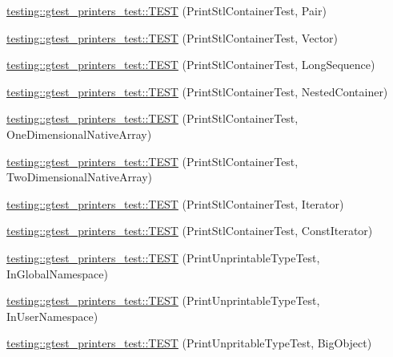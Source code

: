 \begin{DoxyCompactItemize}
\item 
\hyperlink{namespacetesting_1_1gtest__printers__test_ad5d3e873b00c1c9e3f5924e106dd7831}{testing\+::gtest\+\_\+printers\+\_\+test\+::\+T\+E\+ST} (Print\+Stl\+Container\+Test, Pair)
\item 
\hyperlink{namespacetesting_1_1gtest__printers__test_abfab1ea62f0285c0cdbcca500be0dac8}{testing\+::gtest\+\_\+printers\+\_\+test\+::\+T\+E\+ST} (Print\+Stl\+Container\+Test, Vector)
\item 
\hyperlink{namespacetesting_1_1gtest__printers__test_a55eca253f3365ad26183bcc711cb257a}{testing\+::gtest\+\_\+printers\+\_\+test\+::\+T\+E\+ST} (Print\+Stl\+Container\+Test, Long\+Sequence)
\item 
\hyperlink{namespacetesting_1_1gtest__printers__test_ad8fb463805baecdfb95154dec6ec4f27}{testing\+::gtest\+\_\+printers\+\_\+test\+::\+T\+E\+ST} (Print\+Stl\+Container\+Test, Nested\+Container)
\item 
\hyperlink{namespacetesting_1_1gtest__printers__test_a6dd59bbdea483f662fe62e2c55c106ce}{testing\+::gtest\+\_\+printers\+\_\+test\+::\+T\+E\+ST} (Print\+Stl\+Container\+Test, One\+Dimensional\+Native\+Array)
\item 
\hyperlink{namespacetesting_1_1gtest__printers__test_aca371c218e2248562ed258eaf385f4d1}{testing\+::gtest\+\_\+printers\+\_\+test\+::\+T\+E\+ST} (Print\+Stl\+Container\+Test, Two\+Dimensional\+Native\+Array)
\item 
\hyperlink{namespacetesting_1_1gtest__printers__test_a01ec32faf0032f9fbcf4895d8d6e4aa9}{testing\+::gtest\+\_\+printers\+\_\+test\+::\+T\+E\+ST} (Print\+Stl\+Container\+Test, Iterator)
\item 
\hyperlink{namespacetesting_1_1gtest__printers__test_a3b54f9a039804190b7ff2e818169c0f2}{testing\+::gtest\+\_\+printers\+\_\+test\+::\+T\+E\+ST} (Print\+Stl\+Container\+Test, Const\+Iterator)
\item 
\hyperlink{namespacetesting_1_1gtest__printers__test_a805264fd24de8e65cba977a798abc54c}{testing\+::gtest\+\_\+printers\+\_\+test\+::\+T\+E\+ST} (Print\+Unprintable\+Type\+Test, In\+Global\+Namespace)
\item 
\hyperlink{namespacetesting_1_1gtest__printers__test_a0aa1499e978bdde6c71e49ecc9db695b}{testing\+::gtest\+\_\+printers\+\_\+test\+::\+T\+E\+ST} (Print\+Unprintable\+Type\+Test, In\+User\+Namespace)
\item 
\hyperlink{namespacetesting_1_1gtest__printers__test_a6b6fba2a191094244f8aa78a4933a2c5}{testing\+::gtest\+\_\+printers\+\_\+test\+::\+T\+E\+ST} (Print\+Unpritable\+Type\+Test, Big\+Object)

\end{DoxyCompactItemize}
